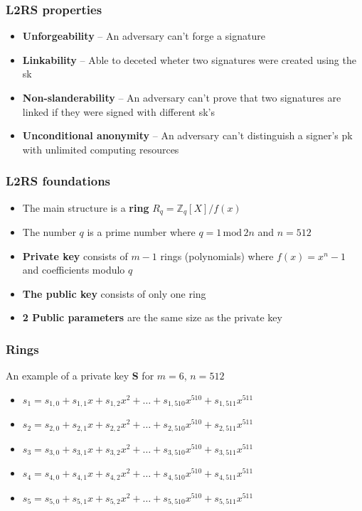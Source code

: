 \documentclass[%
  14pt,       				%
	c,                  %
	aspectratio=1610,   %
	unicode,						%
]{beamer}				    	%
\begin{document}
\begin{frame}
  \frametitle{L2RS properties}
  \large{
    \begin{itemize}
      \item \textbf{Unforgeability} -- An adversary can't forge a signature
      \item \textbf{Linkability} -- Able to deceted wheter two signatures were created using the sk
      \item \textbf{Non-slanderability} -- An adversary can't prove that two signatures are linked if they were signed with different sk's
      \item \textbf{Unconditional anonymity} -- An adversary can't distinguish a signer's pk with unlimited computing resources
    \end{itemize}
  }
\end{frame}


\begin{frame}
  \frametitle{L2RS foundations}
  \large{
    \begin{itemize}
      \item The main structure is a \textbf{ring} $R_q = \mathbb{Z}_q[X]/f(x)$
      \item The number $q$ is a prime number where $q=1\,\mathrm{mod}\,2n$ and $n=512$
      \item \textbf{Private key} consists of $m-1$ rings (polynomials) where $f(x) = x^n - 1$ and coefficients modulo $q$
      \item \textbf{The public key} consists of only one ring
      \item \textbf{2 Public parameters} are the same size as the private key
    \end{itemize}
  }
\end{frame}

\begin{frame}
  \frametitle{Rings}
  \large{
    An example of a private key \textbf{S} for $m=6$, $n=512$
    \begin{itemize}
      \item $s_1 = s_{1,0} + s_{1,1}x + s_{1,2}x^2 + \dots + s_{1,510}x^{510} + s_{1,511}x^{511}$
      \item $s_2 = s_{2,0} + s_{2,1}x + s_{2,2}x^2 + \dots + s_{2,510}x^{510} + s_{2,511}x^{511}$
      \item $s_3 = s_{3,0} + s_{3,1}x + s_{3,2}x^2 + \dots + s_{3,510}x^{510} + s_{3,511}x^{511}$
      \item $s_4 = s_{4,0} + s_{4,1}x + s_{4,2}x^2 + \dots + s_{4,510}x^{510} + s_{4,511}x^{511}$
      \item $s_5 = s_{5,0} + s_{5,1}x + s_{5,2}x^2 + \dots + s_{5,510}x^{510} + s_{5,511}x^{511}$
    \end{itemize}
  }
\end{frame}
\end{document}
